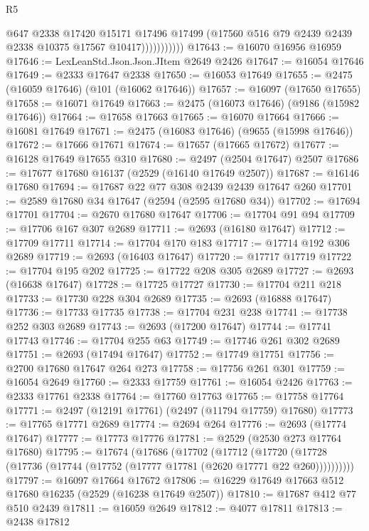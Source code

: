 \begin{lexlean}{R5}
\begin{coremodule}
                        @647
                        @2338
                        @17420
                        @15171
                        @17496
                        @17499
                        (@17560 @516 @79 @2439 @2439 @2338 @10375 @17567 @10417)))))))))))
@17643 := @16070 @16956 @16959
@17646 := LexLeanStd.Json.Json.JItem @2649 @2426
@17647 := @16054 @17646
@17649 := @2333 @17647 @2338
@17650 := @16053 @17649
@17655 := @2475 (@16059 @17646) (@101 (@16062 @17646))
@17657 := @16097 (@17650 @17655)
@17658 := @16071 @17649
@17663 := @2475 (@16073 @17646) (@9186 (@15982 @17646))
@17664 := @17658 @17663
@17665 := @16070 @17664
@17666 := @16081 @17649
@17671 := @2475 (@16083 @17646) (@9655 (@15998 @17646))
@17672 := @17666 @17671
@17674 := @17657 (@17665 @17672)
@17677 := @16128 @17649 @17655 @310
@17680 := @2497 (@2504 @17647) @2507
@17686 := @17677 @17680 @16137 (@2529 (@16140 @17649 @2507))
@17687 := @16146 @17680
@17694 := @17687 @22 @77 @308 @2439 @2439 @17647 @260
@17701 := @2589 @17680 @34 @17647 (@2594 (@2595 @17680 @34))
@17702 := @17694 @17701
@17704 := @2670 @17680 @17647
@17706 := @17704 @91 @94
@17709 := @17706 @167 @307 @2689
@17711 := @2693 (@16180 @17647)
@17712 := @17709 @17711
@17714 := @17704 @170 @183
@17717 := @17714 @192 @306 @2689
@17719 := @2693 (@16403 @17647)
@17720 := @17717 @17719
@17722 := @17704 @195 @202
@17725 := @17722 @208 @305 @2689
@17727 := @2693 (@16638 @17647)
@17728 := @17725 @17727
@17730 := @17704 @211 @218
@17733 := @17730 @228 @304 @2689
@17735 := @2693 (@16888 @17647)
@17736 := @17733 @17735
@17738 := @17704 @231 @238
@17741 := @17738 @252 @303 @2689
@17743 := @2693 (@17200 @17647)
@17744 := @17741 @17743
@17746 := @17704 @255 @63
@17749 := @17746 @261 @302 @2689
@17751 := @2693 (@17494 @17647)
@17752 := @17749 @17751
@17756 := @2700 @17680 @17647 @264 @273
@17758 := @17756 @261 @301
@17759 := @16054 @2649
@17760 := @2333 @17759
@17761 := @16054 @2426
@17763 := @2333 @17761 @2338
@17764 := @17760 @17763
@17765 := @17758 @17764
@17771 := @2497 (@12191 @17761) (@2497 (@11794 @17759) @17680)
@17773 := @17765 @17771 @2689
@17774 := @2694 @264
@17776 := @2693 (@17774 @17647)
@17777 := @17773 @17776
@17781 := @2529 (@2530 @273 @17764 @17680)
@17795 := @17674
    (@17686
      (@17702
        (@17712
          (@17720 (@17728 (@17736 (@17744 (@17752 (@17777 @17781 (@2620 @17771 @22 @260))))))))))
@17797 := @16097 @17664 @17672
@17806 := @16229 @17649 @17663 @512 @17680 @16235 (@2529 (@16238 @17649 @2507))
@17810 := @17687 @412 @77 @510 @2439
@17811 := @16059 @2649
@17812 := @4077 @17811
@17813 := @2438 @17812

\end{coremodule}
\end{lexlean}
